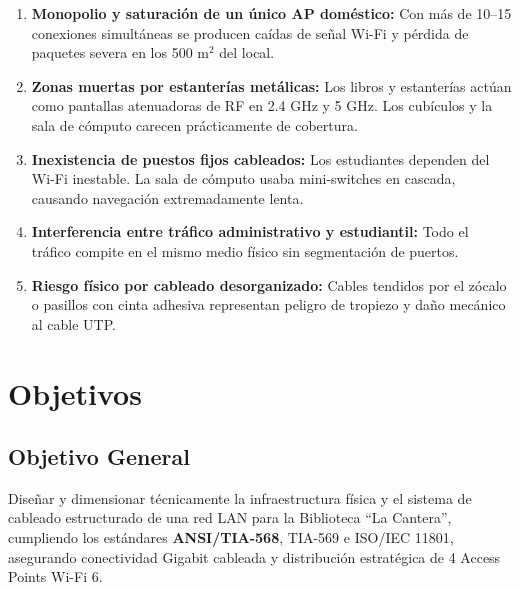 \documentclass[12pt,a4paper]{article}
\begin{document}
\begin{enumerate}[leftmargin=1.8em,label=\textbf{\arabic*.},itemsep=4pt]
  \item \textbf{Monopolio y saturación de un único AP doméstico:} Con más de 10--15 conexiones simultáneas se producen caídas de señal Wi-Fi y pérdida de paquetes severa en los 500 m$^2$ del local.

  \item \textbf{Zonas muertas por estanterías metálicas:} Los libros y estanterías actúan como pantallas atenuadoras de RF en 2.4 GHz y 5 GHz. Los cubículos y la sala de cómputo carecen prácticamente de cobertura.

  \item \textbf{Inexistencia de puestos fijos cableados:} Los estudiantes dependen del Wi-Fi inestable. La sala de cómputo usaba mini-switches en cascada, causando navegación extremadamente lenta.

  \item \textbf{Interferencia entre tráfico administrativo y estudiantil:} Todo el tráfico compite en el mismo medio físico sin segmentación de puertos.

  \item \textbf{Riesgo físico por cableado desorganizado:} Cables tendidos por el zócalo o pasillos con cinta adhesiva representan peligro de tropiezo y daño mecánico al cable UTP.
\end{enumerate}

\section{Objetivos}

\subsection{Objetivo General}
Diseñar y dimensionar técnicamente la infraestructura física y el sistema de cableado estructurado de una red LAN para la Biblioteca ``La Cantera'', cumpliendo los estándares \textbf{ANSI/TIA-568}, TIA-569 e ISO/IEC 11801, asegurando conectividad Gigabit cableada y distribución estratégica de 4 Access Points Wi-Fi 6.
\end{document}

